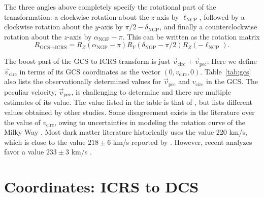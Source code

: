 The three angles above completely specify the rotational part of the transformation: a clockwise rotation about the $z$-axis by $\ell_\text{NCP}$, followed by a clockwise rotation about the $y$-axis by $\pi/2-\delta_\text{NGP}$, and finally a counterclockwise rotation about the $z$-axis by $\alpha_\text{NGP}-\pi$. This can be written as the rotation matrix
\begin{equation}
    R_{\text{GCS}\rightarrow\text{ICRS}}=R_Z(\alpha_\text{NGP}-\pi)R_Y(\delta_\text{NGP}-\pi/2)R_Z(-\ell_\text{NCP}).
\end{equation}

The boost part of the GCS to ICRS transform is just $\vec{v}_\text{circ}+\vec{v}_\text{pec}$. Here we define $\vec{v}_\text{circ}$ in terms of its GCS coordinates as the vector $(0,v_\text{circ},0)$. Table~\ref{tab:gcs} also lists the observationally determined values for $\vec{v}_\text{pec}$ and $v_\text{circ}$ in the GCS. The peculiar velocity, $\vec{v}_\text{pec}$, is challenging to determine and there are multiple estimates of its value. The value listed in the table is that of \textcite{SchonrichBinneyDehnen2010}, but \textcite{Coskunoglu2011} lists different values obtained by other studies. Some disagreement exists in the literature over the value of $v_\text{circ}$, owing to uncertainties in modeling the rotation curve of the Milky Way \parencite{McMillanBinney2009}. Most dark matter literature historically uses the value 220 km/s, which is close to the value $218\pm6$ km/s reported by \textcite{Bovy2012}. However, recent analyzes favor a value $233\pm3$ km/s \parencites{McMillan2017, EvansOHareMcCabe2019}.

\section{Coordinates: ICRS to DCS}

